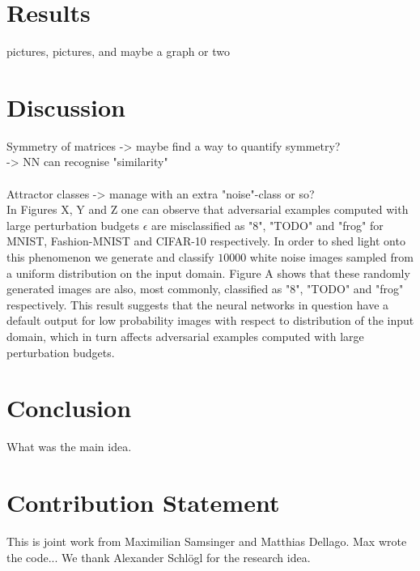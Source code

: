 \documentclass{article}
\begin{document}
\section{Results}
pictures, pictures, and maybe a graph or two


\section{Discussion}

Symmetry of matrices -> maybe find a way to quantify symmetry?\\
-> NN can recognise "similarity"\\
\\

Attractor classes -> manage with an extra "noise"-class or so?\\


In Figures X, Y and Z one can observe that adversarial examples computed with large perturbation budgets $\epsilon$ are misclassified as "8", "TODO" and "frog" for MNIST, Fashion-MNIST and CIFAR-10 respectively. In order to shed light onto this phenomenon we generate and classify $10000$ white noise images sampled from a uniform distribution on the input domain. Figure A shows that these randomly generated images are also, most commonly, classified as "8", "TODO" and "frog" respectively. This result suggests that the neural networks in question have a default output for low probability images with respect to distribution of the input domain, which in turn affects adversarial examples computed with large perturbation budgets.

\section{Conclusion}
What was the main idea.

\section{Contribution Statement}

This is joint work from Maximilian Samsinger and Matthias Dellago. Max wrote the code...
We thank Alexander Schlögl for the research idea.


\end{document}
